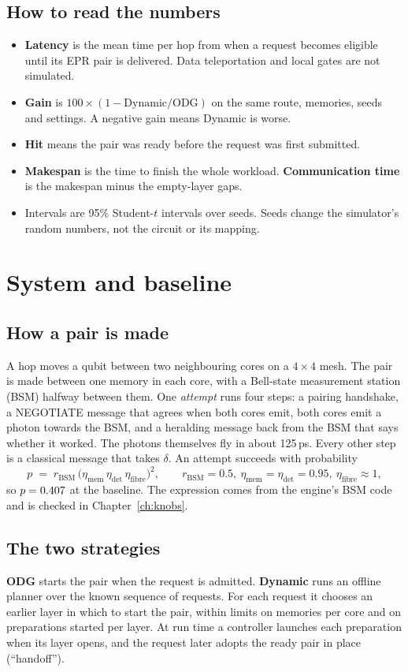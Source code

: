 \documentclass[11pt,a4paper]{report}
\begin{document}
\section{How to read the numbers}
\begin{itemize}
\item \textbf{Latency} is the mean time per hop from when a request becomes eligible until its EPR pair is delivered. Data teleportation and local gates are not simulated.
\item \textbf{Gain} is $100\times(1-\text{Dynamic}/\text{ODG})$ on the same route, memories, seeds and settings. A negative gain means Dynamic is worse.
\item \textbf{Hit} means the pair was ready before the request was first submitted.
\item \textbf{Makespan} is the time to finish the whole workload. \textbf{Communication time} is the makespan minus the empty-layer gaps.
\item Intervals are 95\% Student-$t$ intervals over seeds. Seeds change the simulator's random numbers, not the circuit or its mapping.
\end{itemize}

\chapter{System and baseline}
\section{How a pair is made}
A hop moves a qubit between two neighbouring cores on a $4\times4$ mesh. The pair is made between one memory in each core, with a Bell-state measurement station (BSM) halfway between them. One \emph{attempt} runs four steps: a pairing handshake, a NEGOTIATE message that agrees when both cores emit, both cores emit a photon towards the BSM, and a heralding message back from the BSM that says whether it worked. The photons themselves fly in about 125\,ps. Every other step is a classical message that takes $\delta$. An attempt succeeds with probability
\[ p \;=\; r_{\text{BSM}}\,\bigl(\eta_{\text{mem}}\,\eta_{\text{det}}\,\eta_{\text{fibre}}\bigr)^{2},\qquad r_{\text{BSM}}=0.5,\ \eta_{\text{mem}}=\eta_{\text{det}}=0.95,\ \eta_{\text{fibre}}\approx1, \]
so $p=0.407{}$ at the baseline. The expression comes from the engine's BSM code and is checked in Chapter~\ref{ch:knobs}.

\section{The two strategies}
\textbf{ODG} starts the pair when the request is admitted. \textbf{Dynamic} runs an offline planner over the known sequence of requests. For each request it chooses an earlier layer in which to start the pair, within limits on memories per core and on preparations started per layer. At run time a controller launches each preparation when its layer opens, and the request later adopts the ready pair in place (``handoff'').
\end{document}
